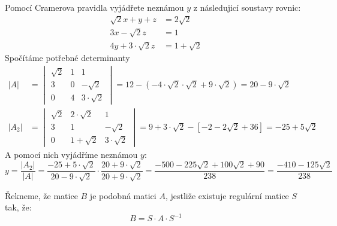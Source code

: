 \begin{example}
    Pomocí Cramerova pravidla vyjádřete neznámou $y$ z následujicí soustavy rovnic:
    \begin{align*}
        \sqrt{2} x + y + z &= 2\sqrt{2}\\
        3x -\sqrt{2}z &= 1\\
        4y + 3\cdot \sqrt{2} z &= 1 + \sqrt{2}
    \end{align*}
    Spočítáme potřebné determinanty
    \begin{align*}
        |A| &=
        \begin{vmatrix}
            \sqrt{2} & 1 & 1\\
            3 & 0 & -\sqrt{2}\\
            0 & 4 & 3\cdot \sqrt{2}
        \end{vmatrix} =
        12 - (-4 \cdot \sqrt{2} \cdot \sqrt{2} + 9 \cdot \sqrt{2}) = 20 - 9 \cdot \sqrt{2} \\
        |A_2| &=
    \begin{vmatrix}
        \sqrt{2} & 2\cdot\sqrt{2} & 1\\
        3 & 1 & -\sqrt{2}\\
        0 & 1+\sqrt{2} & 3\cdot \sqrt{2}
    \end{vmatrix}
    = 9 + 3\cdot \sqrt{2} - [-2 - 2\sqrt{2} + 36] = -25 + 5 \sqrt{2}
      \end{align*}
    A pomocí nich vyjádříme neznámou $y$:
    $$y = \frac{|A_2|}{|A|} = \frac{-25 + 5 \cdot \sqrt{2}}{20 - 9 \cdot \sqrt{2}} \cdot
    \frac{20 + 9 \cdot \sqrt{2}}{20 + 9 \cdot \sqrt{2}} =
    \frac{-500 - 225\sqrt{2} + 100\sqrt{2} + 90}{238} = \frac{-410-125\sqrt{2}}{238}
    $$
\end{example}

\begin{definition}
    Řekneme, že matice $B$ je podobná matici $A$, jestliže existuje regulární
    matice $S$ tak, že:
    $$B = S\cdot A \cdot S^{-1}$$
\end{definition}


